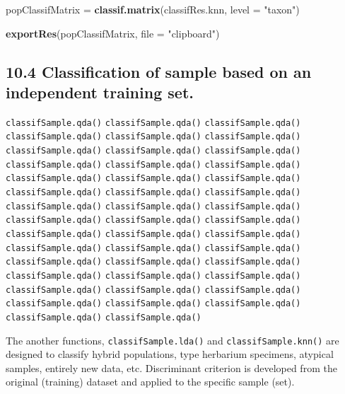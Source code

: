 \documentclass[
]{article}
\newenvironment{Shaded}{\begin{snugshade}}{\end{snugshade}}
\newcommand{\DataTypeTok}[1]{\textcolor[rgb]{0.13,0.29,0.53}{#1}}
\newcommand{\KeywordTok}[1]{\textcolor[rgb]{0.13,0.29,0.53}{\textbf{#1}}}
\newcommand{\NormalTok}[1]{#1}
\newcommand{\StringTok}[1]{\textcolor[rgb]{0.31,0.60,0.02}{#1}}
\begin{document}
\begin{Shaded}
\begin{Highlighting}[]
\NormalTok{popClassifMatrix =}\StringTok{ }\KeywordTok{classif.matrix}\NormalTok{(classifRes.knn, }\DataTypeTok{level =} \StringTok{"taxon"}\NormalTok{)}

\KeywordTok{exportRes}\NormalTok{(popClassifMatrix, }\DataTypeTok{file =} \StringTok{"clipboard"}\NormalTok{)}
\end{Highlighting}
\end{Shaded}

\hypertarget{classification-of-sample-based-on-an-independent-training-set.}{%
\subsection{10.4 Classification of sample based on an independent
training
set.}\label{classification-of-sample-based-on-an-independent-training-set.}}

\texttt{classifSample.qda()} \texttt{classifSample.qda()}
\texttt{classifSample.qda()} \texttt{classifSample.qda()}
\texttt{classifSample.qda()} \texttt{classifSample.qda()}
\texttt{classifSample.qda()} \texttt{classifSample.qda()}
\texttt{classifSample.qda()} \texttt{classifSample.qda()}
\texttt{classifSample.qda()} \texttt{classifSample.qda()}
\texttt{classifSample.qda()} \texttt{classifSample.qda()}
\texttt{classifSample.qda()} \texttt{classifSample.qda()}
\texttt{classifSample.qda()} \texttt{classifSample.qda()}
\texttt{classifSample.qda()} \texttt{classifSample.qda()}
\texttt{classifSample.qda()} \texttt{classifSample.qda()}
\texttt{classifSample.qda()} \texttt{classifSample.qda()}
\texttt{classifSample.qda()} \texttt{classifSample.qda()}
\texttt{classifSample.qda()} \texttt{classifSample.qda()}
\texttt{classifSample.qda()} \texttt{classifSample.qda()}
\texttt{classifSample.qda()} \texttt{classifSample.qda()}
\texttt{classifSample.qda()} \texttt{classifSample.qda()}
\texttt{classifSample.qda()} \texttt{classifSample.qda()}
\texttt{classifSample.qda()} \texttt{classifSample.qda()}
\texttt{classifSample.qda()} \texttt{classifSample.qda()}
\texttt{classifSample.qda()} \texttt{classifSample.qda()}
\texttt{classifSample.qda()} \texttt{classifSample.qda()}

The another functions, \texttt{classifSample.lda()} and
\texttt{classifSample.knn()} are designed to classify hybrid
populations, type herbarium specimens, atypical samples, entirely new
data, etc. Discriminant criterion is developed from the original
(training) dataset and applied to the specific sample (set).
\end{document}
